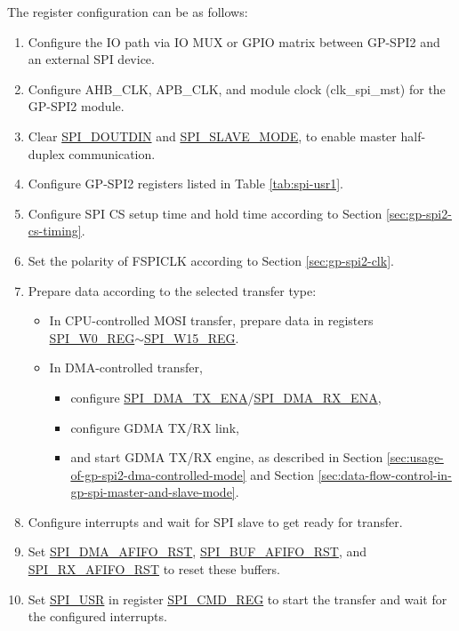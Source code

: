 \documentclass[main\_\_EN.tex]{subfiles}
\begin{document}
The register configuration can be as follows:
\begin{enumerate}
    \item Configure the IO path via IO MUX or GPIO matrix between GP-SPI2 and an external SPI device. 
    \item Configure AHB\_CLK, APB\_CLK, and module clock (clk\_spi\_mst) for the GP-SPI2 module.
    \item Clear \hyperref[fielddesc:SPIDOUTDIN]{SPI\_DOUTDIN} and \hyperref[fielddesc:SPISLAVEMODE]{SPI\_SLAVE\_MODE}, to enable master half-duplex communication.
    \item Configure GP-SPI2 registers listed in Table \ref{tab:spi-usr1}.
    \item Configure SPI CS setup time and hold time according to Section \ref{sec:gp-spi2-cs-timing}.
    \item Set the polarity of FSPICLK according to Section \ref{sec:gp-spi2-clk}. 
    \item Prepare data according to the selected transfer type:
    \begin{itemize}
        \item In CPU-controlled MOSI transfer, prepare data in registers \hyperref[regdesc:SPIW0REG]{SPI\_W0\_REG}$\sim$\hyperref[regdesc:SPIW15REG]{SPI\_W15\_REG}. 
        \item In DMA-controlled transfer, 
        \begin{itemize}
            \item configure \hyperref[fielddesc:SPIDMATXENA]{SPI\_DMA\_TX\_ENA}/\hyperref[fielddesc:SPIDMARXENA]{SPI\_DMA\_RX\_ENA},
            \item configure GDMA TX/RX link,
            \item and start GDMA TX/RX engine, as described in Section \ref{sec:usage-of-gp-spi2-dma-controlled-mode} and Section \ref{sec:data-flow-control-in-gp-spi-master-and-slave-mode}.
        \end{itemize}
    \end{itemize}
    \item Configure interrupts and wait for SPI slave to get ready for transfer.
    \item Set \hyperref[fielddesc:SPIDMAAFIFORST]{SPI\_DMA\_AFIFO\_RST}, \hyperref[fielddesc:SPIBUFAFIFORST]{SPI\_BUF\_AFIFO\_RST}, and \hyperref[fielddesc:SPIRXAFIFORST]{SPI\_RX\_AFIFO\_RST} to reset these buffers.
    \item Set \hyperref[fielddesc:SPIUSR]{SPI\_USR} in register \hyperref[regdesc:SPICMDREG]{SPI\_CMD\_REG} to start the transfer and wait for the configured interrupts.
\end{enumerate}
\end{document}

